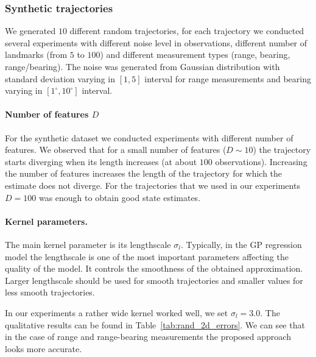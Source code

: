 \subsubsection{Synthetic trajectories}
We generated $10$ different random trajectories, for each trajectory we conducted several experiments
with different noise level in observations,
different number of landmarks (from $5$ to $100$)
and different measurement types (range, bearing, range/bearing).
The noise was generated from Gaussian distribution with standard
deviation varying in $[1, 5]$ interval for range measurements
and bearing varying in $[1^\circ, 10^\circ]$ interval.

\paragraph*{Number of features $D$}
For the synthetic dataset we conducted experiments with different number of features.
We observed that for a small number of features ($D \sim 10$) the trajectory starts diverging when its length increases (at about $100$ observations).
Increasing the number of features increases the length of the trajectory for which the estimate does not diverge.
For the trajectories that we used in our experiments $D=100$ was
enough to obtain good state estimates.

\paragraph*{Kernel parameters.}
The main kernel parameter is its lengthscale $\sigma_l$.
Typically, in the GP regression model the lengthscale is one of the most important parameters affecting the quality of the model.
It controls the smoothness of the obtained approximation.
Larger lengthscale should be used for smooth trajectories and smaller values for
less smooth trajectories.

In our experiments a rather wide kernel worked well,
we set $\sigma_l = 3.0$.
The qualitative results can be found in Table~\ref{tab:rand_2d_errors}.
We can see that in the case of range and range-bearing measurements
the proposed approach looks more accurate.

